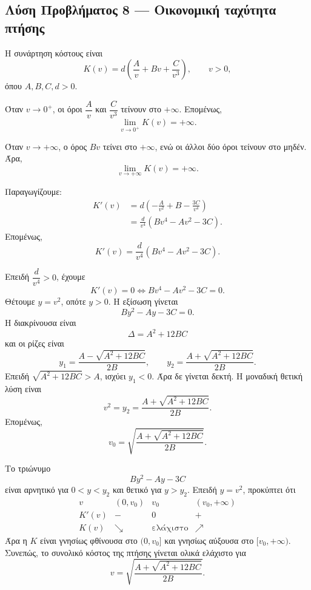 \subsection*{Λύση Προβλήματος 8 --- Οικονομική ταχύτητα πτήσης}

Η συνάρτηση κόστους είναι
\[
  K(v)=d\left(\frac{A}{v}+Bv+\frac{C}{v^3}\right),
  \qquad v>0,
\]
όπου $A,B,C,d>0$.

\begin{alist}
  \item Όταν $v\to0^+$, οι όροι $\dfrac{A}{v}$ και
        $\dfrac{C}{v^3}$ τείνουν στο $+\infty$. Επομένως,
        \[
          {\lim_{v\to0^+}K(v)=+\infty}.
        \]

        Όταν $v\to+\infty$, ο όρος $Bv$ τείνει στο $+\infty$, ενώ οι
        άλλοι δύο όροι τείνουν στο μηδέν. Άρα,
        \[
          {\lim_{v\to+\infty}K(v)=+\infty}.
        \]

  \item Παραγωγίζουμε:
        \begin{align*}
          K'(v)
          &=d\left(-\frac{A}{v^2}+B-\frac{3C}{v^4}\right)\\
          &=\frac{d}{v^4}
            \left(Bv^4-Av^2-3C\right).
        \end{align*}
        Επομένως,
        \[
          {
          K'(v)=\frac{d}{v^4}
          \left(Bv^4-Av^2-3C\right)}.
        \]

  \item Επειδή $\dfrac{d}{v^4}>0$, έχουμε
        \[
          K'(v)=0
          \Longleftrightarrow
          Bv^4-Av^2-3C=0.
        \]
        Θέτουμε $y=v^2$, οπότε $y>0$. Η εξίσωση γίνεται
        \[
          By^2-Ay-3C=0.
        \]
        Η διακρίνουσα είναι
        \[
          \Delta=A^2+12BC
        \]
        και οι ρίζες είναι
        \[
          y_1=\frac{A-\sqrt{A^2+12BC}}{2B},
          \qquad
          y_2=\frac{A+\sqrt{A^2+12BC}}{2B}.
        \]
        Επειδή $\sqrt{A^2+12BC}>A$, ισχύει $y_1<0$. Άρα δε γίνεται
        δεκτή. Η μοναδική θετική λύση είναι
        \[
          v^2=y_2
          =\frac{A+\sqrt{A^2+12BC}}{2B}.
        \]
        Επομένως,
        \[
          {
          v_0=\sqrt{\frac{A+\sqrt{A^2+12BC}}{2B}}}.
        \]

  \item Το τριώνυμο
        \[
          By^2-Ay-3C
        \]
        είναι αρνητικό για $0<y<y_2$ και θετικό για $y>y_2$.
        Επειδή $y=v^2$, προκύπτει ότι
        \[
        \begin{array}{c|ccc}
          v & (0,v_0) & v_0 & (v_0,+\infty)\\ \hline
          K'(v) & - & 0 & +\\
          K(v) & \searrow & \text{ελάχιστο} & \nearrow
        \end{array}
        \]
        Άρα η $K$ είναι γνησίως φθίνουσα στο $(0,v_0]$ και γνησίως
        αύξουσα στο $[v_0,+\infty)$. Συνεπώς, το συνολικό κόστος της
        πτήσης γίνεται ολικά ελάχιστο για
        \[
          {
          v=\sqrt{\frac{A+\sqrt{A^2+12BC}}{2B}}}.
        \]
\end{alist}
